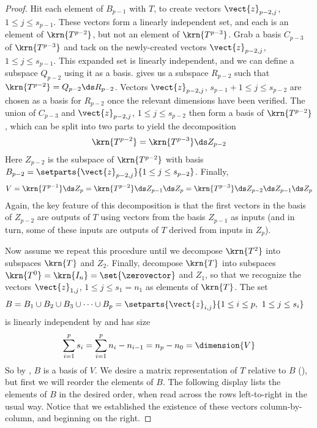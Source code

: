 \begin{proof}
%
Hit each element of $B_{p-1}$ with $T$, to create vectors $\vect{z}_{p-2,j}$, $1\leq j\leq s_{p-1}$.  These vectors form a linearly independent set, and each is an element of $\krn{T^{p-2}}$, but not an element of $\krn{T^{p-3}}$.  Grab a basis $C_{p-3}$ of $\krn{T^{p-3}}$ and tack on the newly-created vectors $\vect{z}_{p-2,j}$, $1\leq j\leq s_{p-1}$.  This expanded set is linearly independent, and we can define a subspace $Q_{p-2}$ using it as a basis.   gives us a subspace $R_{p-2}$ such that $\krn{T^{p-2}}=Q_{p-2}\ds R_{p-2}$.  Vectors $\vect{z}_{p-2,j}$, $s_{p-1}+1\leq j\leq s_{p-2}$ are chosen as a basis for $R_{p-2}$ once the relevant dimensions have been verified.  The union of $C_{p-3}$ and $\vect{z}_{p-2,j}$, $1\leq j\leq s_{p-2}$ then form a basis of $\krn{T^{p-2}}$, which can be split into two parts to yield the decomposition  
%
\begin{align*}
\krn{T^{p-2}}=\krn{T^{p-3}}\ds Z_{p-2}
\end{align*}
%
Here $Z_{p-2}$ is the subspace of $\krn{T^{p-2}}$ with basis $B_{p-2}=\setparts{\vect{z}_{p-2,j}}{1\leq j\leq s_{p-2}}$.  Finally,
%
\begin{align*}
V=\krn{T^{p-1}}\ds Z_{p}=\krn{T^{p-2}}\ds Z_{p-1}\ds Z_{p}=\krn{T^{p-3}}\ds Z_{p-2}\ds Z_{p-1}\ds Z_{p}
\end{align*}
%
Again, the key feature of this decomposition is that the first vectors in the basis of $Z_{p-2}$ are outputs of $T$ using vectors from the basis $Z_{p-1}$ as inputs (and in turn, some of these inputs are outputs of $T$ derived from inputs in $Z_p$).\par
%
Now assume we repeat this procedure until we decompose $\krn{T^{2}}$ into subspaces $\krn{T}$ and $Z_2$.  Finally, decompose $\krn{T}$ into subspaces $\krn{T^0}=\krn{I_n}=\set{\zerovector}$ and $Z_1$, so that we recognize the vectors $\vect{z}_{1,j}$, $1\leq j\leq s_1=n_1$ as elements of $\krn{T}$.  The set
%
\begin{align*}
B
&=B_1\cup B_2\cup B_3\cup\cdots\cup B_p
=\setparts{\vect{z}_{i,j}}{1\leq i\leq p,\ 1\leq j\leq s_i}
\end{align*}
%
is linearly independent by  and has size 
%
\begin{align*}
\sum_{i=1}^{p}s_i=\sum_{i=1}^{p}n_i-n_{i-1}=n_p-n_0=\dimension{V}
\end{align*}
%
So by , $B$ is a basis of $V$.  We desire a matrix representation of $T$ relative to $B$ (), but first we will reorder the elements of $B$.  The following display lists the elements of $B$ in the desired order, when read across the rows left-to-right in the usual way.  Notice that we established the existence of these vectors column-by-column, and beginning on the right.

\end{proof}
